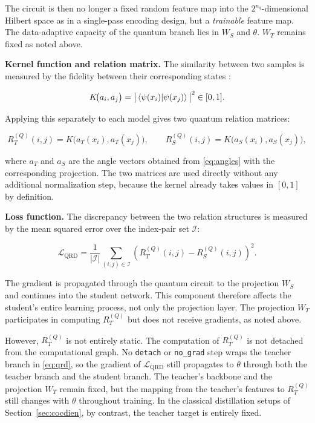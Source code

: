 The circuit is then no longer a fixed random feature map into the
$2^{n_q}$-dimensional Hilbert space as in a single-pass encoding
design, but a \emph{trainable} feature map. The data-adaptive
capacity of the quantum branch lies in $W_S$ and $\theta$. $W_T$
remains fixed as noted above.

\textbf{Kernel function and relation matrix.} The similarity between
two samples is measured by the fidelity between their corresponding
states \cite{schuld2019quantum}:

\begin{equation}
\label{eq:kernel}
K\!\big(a_i, a_j\big) =
  \big| \braket{ \psi(x_i) | \psi(x_j) } \big|^{2} \in [0,1].
\end{equation}

Applying this separately to each model gives two quantum relation
matrices:

\begin{equation}
\label{eq:relmat}
R_T^{(Q)}(i,j) = K\!\big(a_T(x_i), a_T(x_j)\big),
\qquad
R_S^{(Q)}(i,j) = K\!\big(a_S(x_i), a_S(x_j)\big),
\end{equation}

where $a_T$ and $a_S$ are the angle vectors obtained from
\eqref{eq:angles} with the corresponding projection. The two matrices
are used directly without any additional normalization step, because
the kernel already takes values in $[0,1]$ by definition.

\textbf{Loss function.} The discrepancy between the two relation
structures is measured by the mean squared error over the index-pair
set $\mathcal{I}$:

\begin{equation}
\label{eq:qrd}
\mathcal{L}_{\mathrm{QRD}} = \frac{1}{|\mathcal{I}|}
  \sum_{(i,j) \in \mathcal{I}}
  \left( R_T^{(Q)}(i,j) - R_S^{(Q)}(i,j) \right)^{2}.
\end{equation}

The gradient is propagated through the quantum circuit to the projection $W_S$ and continues into the student network. This component therefore affects the student's entire learning process, not only the projection layer. The projection $W_T$ participates in computing
$R_T^{(Q)}$ but does not receive gradients, as noted above.

However, $R_T^{(Q)}$ is not entirely static. The computation of
$R_T^{(Q)}$ is not detached from the computational graph. No
\texttt{detach} or \texttt{no\_grad} step wraps the teacher branch in
\eqref{eq:qrd}, so the gradient of $\mathcal{L}_{\mathrm{QRD}}$ still
propagates to $\theta$ through both the teacher branch and the
student branch. The teacher's backbone and the projection $W_T$
remain fixed, but the mapping from the teacher's features to
$R_T^{(Q)}$ still changes with $\theta$ throughout training. In the classical distillation setups of Section~\ref{sec:cocdien}, by contrast, the teacher target is entirely fixed.

